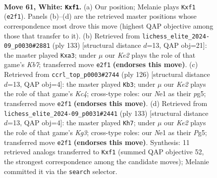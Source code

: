 \documentclass[11pt]{article}
\begin{document}
\clearpage

\begin{figure}[p]\centering
\begin{subfigure}{0.46\textwidth}\centering
\resizebox{\linewidth}{!}{%
\newchessgame
\chessboard[
  setfen={8/8/7R/3k3P/2p5/8/1P2K3/4Nr2 w - - 0 61},
  showmover=false,
  pgfstyle=straightmove, color=movearrow, markmove={e2-f1}
]}
\caption{}
\end{subfigure}\hfill
\begin{subfigure}{0.46\textwidth}\centering
\resizebox{\linewidth}{!}{%
\newchessgame
\chessboard[
  setfen={8/8/5P2/4K1Pp/7r/R7/1k6/8 b - - 0 67},
  showmover=false,
  pgfstyle=straightmove, color=movearrow, markmove={b2-a3}
]}
\caption{}
\end{subfigure}
\\[4pt]
\begin{subfigure}{0.46\textwidth}\centering
\resizebox{\linewidth}{!}{%
\newchessgame
\chessboard[
  setfen={1R6/1P4k1/5p2/6p1/2K3P1/8/8/2r5 w - - 1 64},
  showmover=false,
  pgfstyle=straightmove, color=movearrow, markmove={c4-b3}
]}
\caption{}
\end{subfigure}\hfill
\begin{subfigure}{0.46\textwidth}\centering
\resizebox{\linewidth}{!}{%
\newchessgame
\chessboard[
  setfen={8/8/R5k1/6p1/8/4KP1p/7r/8 b - - 7 67},
  showmover=false,
  pgfstyle=straightmove, color=movearrow, markmove={g6-h7}
]}
\caption{}
\end{subfigure}
\caption{\textbf{Move 61, White: \texttt{Kxf1}.} (a) Our position; Melanie plays \texttt{Kxf1} (\texttt{e2f1}). Panels (b)--(d) are the retrieved master positions whose correspondence most drove this move (highest QAP objective among those that transfer to it). (b) Retrieved from \texttt{lichess\_elite\_2024-09\_p0030\#2881} (ply 133) [structural distance $d$=13, QAP obj=21]: the master played \texttt{Kxa3}; under $\mu$ our \emph{Ke2} plays the role of that game's \emph{Kb7}; transferred move \texttt{e2f1} \textbf{(endorses this move)}. (c) Retrieved from \texttt{ccrl\_top\_p0003\#2744} (ply 126) [structural distance $d$=13, QAP obj=4]: the master played \texttt{Kb3}; under $\mu$ our \emph{Ke2} plays the role of that game's \emph{Kc4}; cross-type roles: our \emph{N}e1 as their \emph{p}g5; transferred move \texttt{e2f1} \textbf{(endorses this move)}. (d) Retrieved from \texttt{lichess\_elite\_2024-09\_p0031\#2441} (ply 133) [structural distance $d$=13, QAP obj=4]: the master played \texttt{Kh7}; under $\mu$ our \emph{Ke2} plays the role of that game's \emph{Kg3}; cross-type roles: our \emph{N}e1 as their \emph{P}g5; transferred move \texttt{e2f1} \textbf{(endorses this move)}. Synthesis: 11 retrieved analogs transferred to \texttt{Kxf1} (summed QAP objective 52, the strongest correspondence among the candidate moves); Melanie committed it via the \texttt{search} selector.}
\label{fig:thought-m120}
\end{figure}
\end{document}
